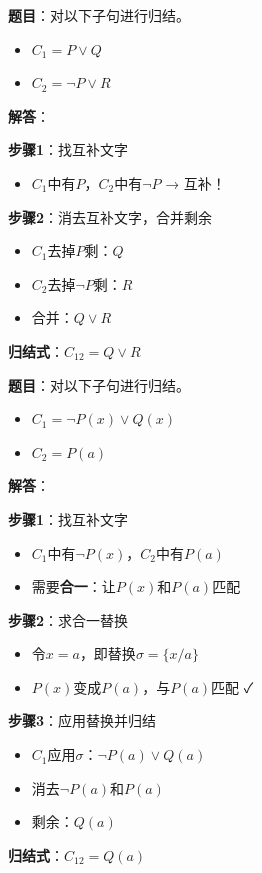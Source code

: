 \begin{examplebox}[例题3.9 简单归结]
\textbf{题目}：对以下子句进行归结。
\begin{itemize}[itemsep=0pt]
    \item $C_1 = P \lor Q$
    \item $C_2 = \neg P \lor R$
\end{itemize}
\tcblower
\textbf{解答}：

\textbf{步骤1}：找互补文字
\begin{itemize}[itemsep=0pt]
    \item $C_1$中有$P$，$C_2$中有$\neg P$ → 互补！
\end{itemize}

\textbf{步骤2}：消去互补文字，合并剩余
\begin{itemize}[itemsep=0pt]
    \item $C_1$去掉$P$剩：$Q$
    \item $C_2$去掉$\neg P$剩：$R$
    \item 合并：$Q \lor R$
\end{itemize}

\textbf{归结式}：$C_{12} = Q \lor R$
\end{examplebox}

\begin{examplebox}[例题3.10 带变量的归结]
\textbf{题目}：对以下子句进行归结。
\begin{itemize}[itemsep=0pt]
    \item $C_1 = \neg P(x) \lor Q(x)$
    \item $C_2 = P(a)$
\end{itemize}
\tcblower
\textbf{解答}：

\textbf{步骤1}：找互补文字
\begin{itemize}[itemsep=0pt]
    \item $C_1$中有$\neg P(x)$，$C_2$中有$P(a)$
    \item 需要\textbf{合一}：让$P(x)$和$P(a)$匹配
\end{itemize}

\textbf{步骤2}：求合一替换
\begin{itemize}[itemsep=0pt]
    \item 令$x = a$，即替换$\sigma = \{x/a\}$
    \item $P(x)$变成$P(a)$，与$P(a)$匹配 ✓
\end{itemize}

\textbf{步骤3}：应用替换并归结
\begin{itemize}[itemsep=0pt]
    \item $C_1$应用$\sigma$：$\neg P(a) \lor Q(a)$
    \item 消去$\neg P(a)$和$P(a)$
    \item 剩余：$Q(a)$
\end{itemize}

\textbf{归结式}：$C_{12} = Q(a)$
\end{examplebox}


